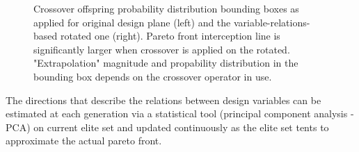 \begin{figure}[h!]
\begin{minipage}[b]{0.5\linewidth}
 \centering
\end{minipage}
\begin{minipage}[b]{0.5\linewidth}
 \centering
\end{minipage}
\caption{Crossover offspring probability distribution bounding boxes as applied for original design plane (left) and the variable-relations-based rotated one (right). Pareto front interception line is significantly larger when crossover is applied on the rotated. "Extrapolation" magnitude and propability distribution in the bounding box depends on the crossover operator in use.}
\label{xover}
\end{figure}

The directions that describe the relations between design variables can be estimated at each generation via a statistical tool (principal component analysis -PCA) on current elite set and updated continuously as the elite set tents to approximate the actual pareto front. 

